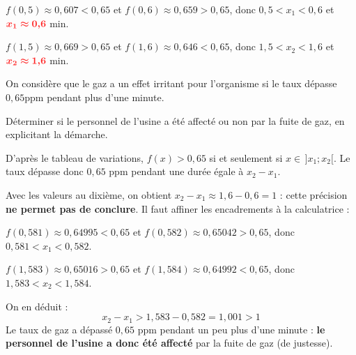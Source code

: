 \documentclass[11pt,a4paper]{article}  %
\begin{document}
\begin{enumMet}
\begin{enumMet}
			\begin{corrBox}
				$f(0{,}5)\approx0{,}607<0{,}65$ et $f(0{,}6)\approx0{,}659>0{,}65$, donc $0{,}5<x_1<0{,}6$ et $\mRouge{x_1\approx0{,}6}$ min.
				
				$f(1{,}5)\approx0{,}669>0{,}65$ et $f(1{,}6)\approx0{,}646<0{,}65$, donc $1{,}5<x_2<1{,}6$ et $\mRouge{x_2\approx1{,}6}$ min.
			\end{corrBox}
		\end{enumMet}
		
		\item On considère que le gaz a un effet irritant pour l'organisme si le taux dépasse $0,65 \mathrm{ppm}$ pendant plus d'une minute.
		
		Déterminer si le personnel de l'usine a été affecté ou non par la fuite de gaz, en explicitant la démarche.
		
		\begin{corrBox}
			D'après le tableau de variations, $f(x)>0{,}65$ si et seulement si $x\in\,]x_1;x_2[$. Le taux dépasse donc $0{,}65$ ppm pendant une durée égale à $x_2-x_1$.
			
			Avec les valeurs au dixième, on obtient $x_2-x_1\approx1{,}6-0{,}6=1$ : cette précision \textbf{ne permet pas de conclure}. Il faut affiner les encadrements à la calculatrice :
			
			$f(0{,}581)\approx0{,}64995<0{,}65$ et $f(0{,}582)\approx0{,}65042>0{,}65$, donc $0{,}581<x_1<0{,}582$.
			
			$f(1{,}583)\approx0{,}65016>0{,}65$ et $f(1{,}584)\approx0{,}64992<0{,}65$, donc $1{,}583<x_2<1{,}584$.
			
			On en déduit :
			\[x_2-x_1>1{,}583-0{,}582=1{,}001>1\]
			Le taux de gaz a dépassé $0{,}65$ ppm pendant un peu plus d'une minute : \textbf{le personnel de l'usine a donc été affecté} par la fuite de gaz (de justesse).
		\end{corrBox}
	\end{enumMet}
	
\end{document}
